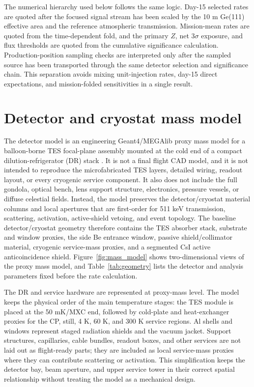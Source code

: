 \documentclass[preprint,12pt]{elsarticle}
\begin{document}
The numerical hierarchy used below follows the same logic. Day-15 selected
rates are quoted after the focused signal stream has been scaled by the 10 m
Ge(111) effective area and the reference atmospheric transmission.
Mission-mean rates are quoted from the time-dependent fold, and the primary
$Z$, net $3\sigma$ exposure, and flux thresholds are quoted from the cumulative
significance calculation. Production-position sampling checks are interpreted
only after the sampled source has been transported through the same detector
selection and significance chain. This separation avoids mixing unit-injection
rates, day-15 direct expectations, and mission-folded sensitivities in a single
result.

\FloatBarrier

\section{Detector and cryostat mass model}
\label{sec:geometry}

The detector model is an engineering Geant4/MEGAlib proxy mass model for a balloon-borne TES focal-plane assembly mounted at the cold end of a compact dilution-refrigerator (DR) stack \cite{Shirazi2023,Gottardi2021TESReview}. It is not a final flight CAD model, and it is not intended to reproduce the microfabricated TES layers, detailed wiring, readout layout, or every cryogenic service component. It also does not include the full gondola, optical bench, lens support structure, electronics, pressure vessels, or diffuse celestial fields. Instead, the model preserves the detector/cryostat material columns and local apertures that are first-order for 511 keV transmission, scattering, activation, active-shield vetoing, and event topology. The baseline detector/cryostat geometry therefore contains the TES absorber stack, substrate and window proxies, the side Be entrance window, passive shield/collimator material, cryogenic service-mass proxies, and a segmented CsI active anticoincidence shield. Figure~\ref{fig:mass_model} shows two-dimensional views of the proxy mass model, and Table~\ref{tab:geometry} lists the detector and analysis parameters fixed before the rate calculation.

The DR and service hardware are represented at proxy-mass level. The model keeps the physical order of the main temperature stages: the TES module is placed at the 50 mK/MXC end, followed by cold-plate and heat-exchanger proxies for the CP, still, 4 K, 60 K, and 300 K service regions. Al shells and windows represent staged radiation shields and the vacuum jacket. Support structures, capillaries, cable bundles, readout boxes, and other services are not laid out as flight-ready parts; they are included as local service-mass proxies where they can contribute scattering or activation. This simplification keeps the detector bay, beam aperture, and upper service tower in their correct spatial relationship without treating the model as a mechanical design.
\end{document}

